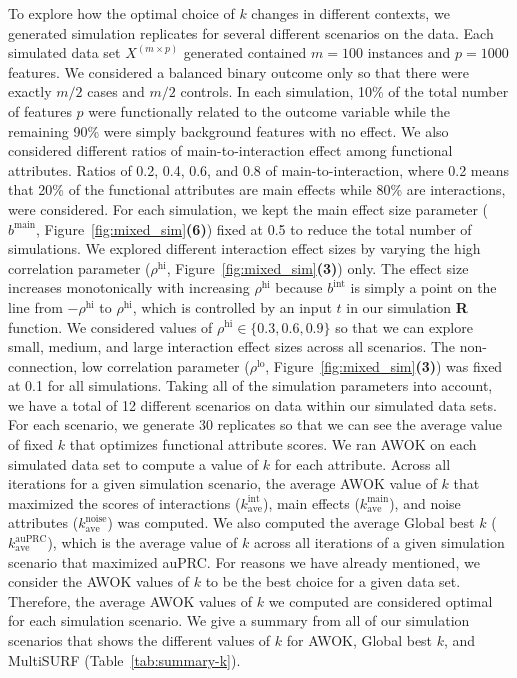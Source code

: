 \documentclass[10pt,letterpaper]{article}
\begin{document}
To explore how the optimal choice of $k$ changes in different contexts, we generated simulation replicates for several different scenarios on the data. Each simulated data set $X^{(m \times p)}$ generated contained $m=100$ instances and $p=1000$ features. We considered a balanced binary outcome only so that there were exactly $m/2$ cases and $m/2$ controls. In each simulation, 10\% of the total number of features $p$ were functionally related to the outcome variable while the remaining 90\% were simply background features with no effect. We also considered different ratios of main-to-interaction effect among functional attributes. Ratios of 0.2, 0.4, 0.6, and 0.8 of main-to-interaction, where 0.2 means that 20\% of the functional attributes are main effects while 80\% are interactions, were considered. For each simulation, we kept the main effect size parameter ($b^\text{main}$, Figure~\ref{fig:mixed_sim}\textbf{(6)}) fixed at 0.5 to reduce the total number of simulations. We explored different interaction effect sizes by varying the high correlation parameter ($\rho^\text{hi}$, Figure~\ref{fig:mixed_sim}\textbf{(3)}) only. The effect size increases monotonically with increasing $\rho^\text{hi}$ because $b^\text{int}$ is simply a point on the line from $-\rho^\text{hi}$ to $\rho^\text{hi}$, which is controlled by an input $t$ in our simulation \textbf{\textsf{R}} function. We considered values of $\rho^\text{hi} \in \{0.3,0.6,0.9\}$ so that we can explore small, medium, and large interaction effect sizes across all scenarios. The non-connection, low correlation parameter ($\rho^\text{lo}$, Figure~\ref{fig:mixed_sim}\textbf{(3)}) was fixed at 0.1 for all simulations. Taking all of the simulation parameters into account, we have a total of 12 different scenarios on data within our simulated data sets. For each scenario, we generate 30 replicates so that we can see the average value of fixed $k$ that optimizes functional attribute scores. We ran AWOK on each simulated data set to compute a value of $k$ for each attribute. Across all iterations for a given simulation scenario, the average AWOK value of $k$ that maximized the scores of interactions ($k^\text{int}_\text{ave}$), main effects ($k^\text{main}_\text{ave}$), and noise attributes ($k^\text{noise}_\text{ave}$) was computed. We also computed the average Global best $k$ ($k^\text{auPRC}_\text{ave}$), which is the average value of $k$ across all iterations of a given simulation scenario that maximized auPRC. For reasons we have already mentioned, we consider the AWOK values of $k$ to be the best choice for a given data set. Therefore, the average AWOK values of $k$ we computed are considered optimal for each simulation scenario. We give a summary from all of our simulation scenarios that shows the different values of $k$ for AWOK, Global best $k$, and MultiSURF (Table~\ref{tab:summary-k}).
\end{document}
